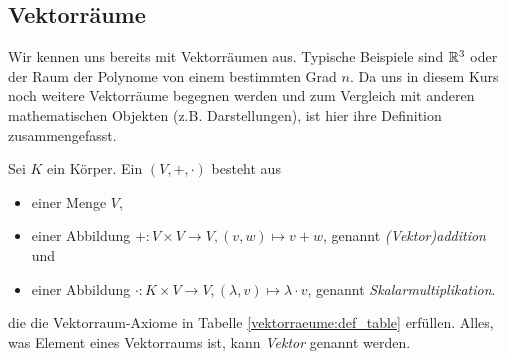 \subsection{Vektorräume}
Wir kennen uns bereits mit Vektorräumen aus. Typische Beispiele sind $\mathbb{R}^3$ oder der Raum der Polynome von einem bestimmten Grad $n$. Da uns in diesem Kurs noch weitere Vektorräume begegnen werden und zum Vergleich mit anderen mathematischen Objekten (z.B. Darstellungen), ist hier ihre Definition zusammengefasst.


\begin{definition}\label{vektorraeume:def}
Sei $K$ ein Körper. Ein  $(V,+,\cdot)$ besteht aus
\begin{itemize}
	\item einer Menge $V$,
	\item einer Abbildung $+: V \times V \to V, (v,w) \mapsto v+w$, genannt \emph{(Vektor)addition} und
	\item einer Abbildung $\cdot: K \times V \to V, (\lambda,v) \mapsto \lambda\cdot v$, genannt \emph{Skalarmultiplikation}.
\end{itemize}
die die Vektorraum-Axiome in Tabelle \ref{vektorraeume:def_table} erfüllen. Alles, was Element eines Vektorraums ist, kann \emph{Vektor} genannt werden.

\begin{table}[!ht]
	\setlength\extrarowheight{10pt} %
	\begin{tabularx}{\textwidth}{p{7cm} X}
		

\end{tabularx}
\end{table}
\end{definition}
